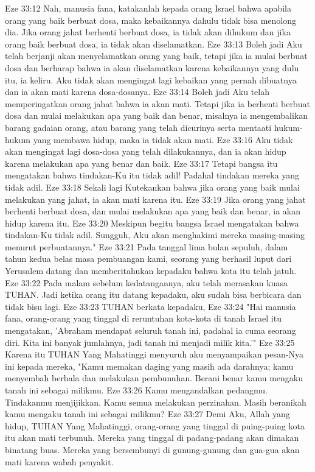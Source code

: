 Eze 33:12  Nah, manusia fana, katakanlah kepada orang Israel bahwa apabila orang yang baik berbuat dosa, maka kebaikannya dahulu tidak bisa menolong dia. Jika orang jahat berhenti berbuat dosa, ia tidak akan dihukum dan jika orang baik berbuat dosa, ia tidak akan diselamatkan.
Eze 33:13  Boleh jadi Aku telah berjanji akan menyelamatkan orang yang baik, tetapi jika ia mulai berbuat dosa dan berharap bahwa ia akan diselamatkan karena kebaikannya yang dulu itu, ia keliru. Aku tidak akan mengingat lagi kebaikan yang pernah dibuatnya dan ia akan mati karena dosa-dosanya.
Eze 33:14  Boleh jadi Aku telah memperingatkan orang jahat bahwa ia akan mati. Tetapi jika ia berhenti berbuat dosa dan mulai melakukan apa yang baik dan benar, misalnya ia mengembalikan barang gadaian orang, atau barang yang telah dicurinya serta mentaati hukum-hukum yang membawa hidup, maka ia tidak akan mati.
Eze 33:16  Aku tidak akan mengingat lagi dosa-dosa yang telah dilakukannya, dan ia akan hidup karena melakukan apa yang benar dan baik.
Eze 33:17  Tetapi bangsa itu mengatakan bahwa tindakan-Ku itu tidak adil! Padahal tindakan mereka yang tidak adil.
Eze 33:18  Sekali lagi Kutekankan bahwa jika orang yang baik mulai melakukan yang jahat, ia akan mati karena itu.
Eze 33:19  Jika orang yang jahat berhenti berbuat dosa, dan mulai melakukan apa yang baik dan benar, ia akan hidup karena itu.
Eze 33:20  Meskipun begitu bangsa Israel mengatakan bahwa tindakan-Ku tidak adil. Sungguh, Aku akan menghakimi mereka masing-masing menurut perbuatannya."
Eze 33:21  Pada tanggal lima bulan sepuluh, dalam tahun kedua belas masa pembuangan kami, seorang yang berhasil luput dari Yerusalem datang dan memberitahukan kepadaku bahwa kota itu telah jatuh.
Eze 33:22  Pada malam sebelum kedatangannya, aku telah merasakan kuasa TUHAN. Jadi ketika orang itu datang kepadaku, aku sudah bisa berbicara dan tidak bisu lagi.
Eze 33:23  TUHAN berkata kepadaku,
Eze 33:24  "Hai manusia fana, orang-orang yang tinggal di reruntuhan kota-kota di tanah Israel itu mengatakan, 'Abraham mendapat seluruh tanah ini, padahal ia cuma seorang diri. Kita ini banyak jumlahnya, jadi tanah ini menjadi milik kita.'"
Eze 33:25  Karena itu TUHAN Yang Mahatinggi menyuruh aku menyampaikan pesan-Nya ini kepada mereka, "Kamu memakan daging yang masih ada darahnya; kamu menyembah berhala dan melakukan pembunuhan. Berani benar kamu mengaku tanah ini sebagai milikmu.
Eze 33:26  Kamu mengandalkan pedangmu. Tindakanmu menjijikkan. Kamu semua melakukan perzinahan. Masih beranikah kamu mengaku tanah ini sebagai milikmu?
Eze 33:27  Demi Aku, Allah yang hidup, TUHAN Yang Mahatinggi, orang-orang yang tinggal di puing-puing kota itu akan mati terbunuh. Mereka yang tinggal di padang-padang akan dimakan binatang buas. Mereka yang bersembunyi di gunung-gunung dan gua-gua akan mati karena wabah penyakit.
